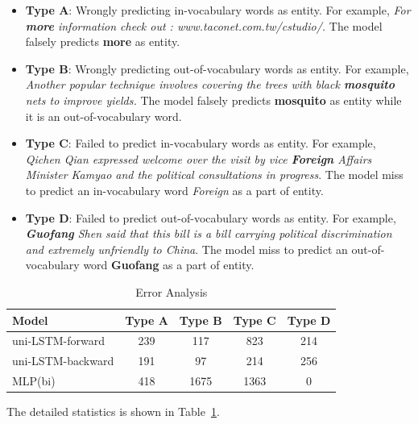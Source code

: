\documentclass{article}
\begin{document}
\begin{itemize}
	\item \textbf{Type A}: Wrongly predicting in-vocabulary words as entity. For example,\textit{ For \textbf{more} information check out : www.taconet.com.tw/cstudio/.} The model falsely predicts \textbf{more} as entity.
	\item \textbf{Type B}: Wrongly predicting out-of-vocabulary words as entity. For example, \textit{Another popular technique involves covering the trees with black \textbf{mosquito} nets to improve yields.} The model falsely predicts \textbf{mosquito} as entity while it is an out-of-vocabulary word.
	\item \textbf{Type C}: Failed to predict in-vocabulary words as entity. For example, \textit{Qichen Qian expressed welcome over the visit by vice \textbf{Foreign} Affairs Minister Kamyao and the political consultations in progress}. The model miss to predict an in-vocabulary word \textit{Foreign} as a part of entity.
	\item \textbf{Type D}: Failed to predict out-of-vocabulary words as entity. For example, \textit{\textbf{Guofang} Shen said that this bill is a bill carrying political discrimination and extremely unfriendly to China}. The model miss to predict an out-of-vocabulary word \textbf{Guofang} as a part of entity.
\end{itemize}

\begin{table}[t]
	\centering
	\begin{tabular}{l@{\qquad}cccc}
		\toprule
		\textbf{Model}         & Type A & Type B & Type C & Type D \\ \midrule
		uni-LSTM-forward &  239  & 117 & 823 & 214 \\
		uni-LSTM-backward & 191 & 97 & 214 & 256  \\
		MLP(bi) & 418 & 1675 & 1363 & 0  \\ 
		\bottomrule
	\end{tabular}
	\vspace{3mm}
	\caption{Error Analysis }
	\label{res:ner_error}
\end{table}


The detailed statistics is shown in Table~\ref{res:ner_error}. 
\end{document}
